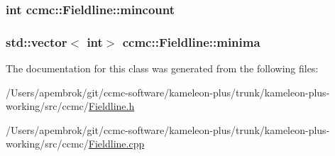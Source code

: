 \hypertarget{classccmc_1_1_fieldline_a2f909b007d4886fa23a7e7281c946274}{
\subsubsection[{mincount}]{\setlength{\rightskip}{0pt plus 5cm}int ccmc\-::\-Fieldline\-::mincount}}\label{classccmc_1_1_fieldline_a2f909b007d4886fa23a7e7281c946274}
\hypertarget{classccmc_1_1_fieldline_ae2e528d518e0342ecf3ec1241a5eeac0}{
\subsubsection[{minima}]{\setlength{\rightskip}{0pt plus 5cm}std\-::vector$<$ int$>$ ccmc\-::\-Fieldline\-::minima}}\label{classccmc_1_1_fieldline_ae2e528d518e0342ecf3ec1241a5eeac0}


The documentation for this class was generated from the following files\-:\begin{DoxyCompactItemize}
\item 
/\-Users/apembrok/git/ccmc-\/software/kameleon-\/plus/trunk/kameleon-\/plus-\/working/src/ccmc/\hyperlink{_fieldline_8h}{Fieldline.\-h}\item 
/\-Users/apembrok/git/ccmc-\/software/kameleon-\/plus/trunk/kameleon-\/plus-\/working/src/ccmc/\hyperlink{_fieldline_8cpp}{Fieldline.\-cpp}\end{DoxyCompactItemize}
